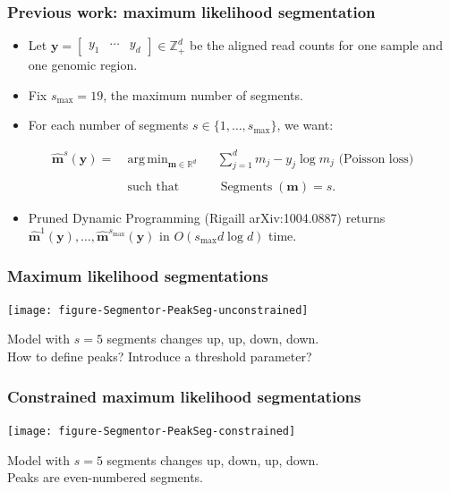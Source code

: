 \documentclass{beamer}
\DeclareMathOperator*{\argmin}{arg\,min}
\DeclareMathOperator*{\Lik}{Lik}
\DeclareMathOperator*{\Segments}{Segments}
\newcommand{\RR}{\mathbb R}
\newcommand{\ZZ}{\mathbb Z}
\begin{document}
\begin{frame}
  \frametitle{Previous work: maximum likelihood segmentation}
  \begin{itemize}
  \item   Let $\mathbf y = 
\left[
  \begin{array}{ccc}
    y_1 & \cdots & y_d
  \end{array}
\right]
\in\ZZ_+^d$ be the aligned read counts for one sample
  and one genomic region.
\item Fix $s_{\text{max}}=19$, the maximum number of segments.
\item For each number of segments $s\in\{1, \dots,
  s_{\text{max}}\}$, we want:
  \end{itemize}
  \begin{equation*}
    \label{argmax:M}
    \begin{aligned}
      \mathbf{\hat m}^s(\mathbf y)  =\ 
      &\argmin_{\mathbf m\in\RR^{d}} && \sum_{j=1}^d
      m_j - y_j \log m_j \text{ (Poisson loss)}
      \\
      \\
      &\text{such that} && \Segments(\mathbf m)=s.
    \end{aligned}
  \end{equation*}
  \begin{itemize}
  \item Pruned Dynamic Programming (Rigaill arXiv:1004.0887) returns
    $\mathbf{\hat m}^1(\mathbf y), \dots, \mathbf{\hat
      m}^{s_{\text{max}}}(\mathbf y)$ in $O(s_{\text{max}} d\log d)$
    time.
  \end{itemize}
\end{frame}

\begin{frame}
  \frametitle{Maximum likelihood segmentations}
  \texttt{[image: figure-Segmentor-PeakSeg-unconstrained]}
  
  Model with $s=5$ segments changes up, up, down, down.\\
  How to define peaks? Introduce a threshold parameter?
\end{frame}

\begin{frame}
  \frametitle{Constrained maximum likelihood segmentations}
  \texttt{[image: figure-Segmentor-PeakSeg-constrained]}

  Model with $s=5$ segments changes up, down, up, down.\\
  Peaks are even-numbered segments.
\end{frame}
\end{document}

